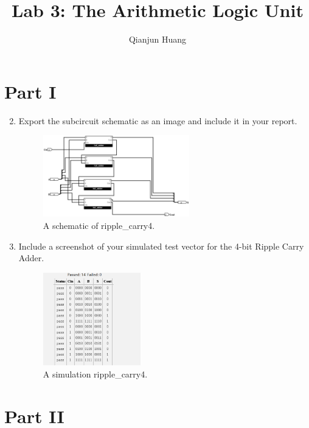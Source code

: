 \documentclass{article}
\title{Lab 3: The Arithmetic Logic Unit}
\author{Qianjun Huang}
\begin{document}
\maketitle

\section*{Part I}

\begin{enumerate}
\setcounter{enumi}{1}
\item Export the subcircuit schematic as an image and include it in your report.

\begin{figure}[ht!]
    \centering
    \includegraphics[width=0.6\textwidth]{lab3_part1.png}
    \caption{A schematic of ripple\_carry4.}
    \label{f:part1}
\end{figure}

\item Include a screenshot of your simulated test vector for the 4-bit Ripple Carry Adder.

\begin{figure}[ht!]
    \centering
    \includegraphics[width=0.4\textwidth]{lab3_part1_simulation.png}
    \caption{A simulation ripple\_carry4.}
    \label{f:part1_simulation}
\end{figure}
\end{enumerate}

\section*{Part II}
\end{document}
